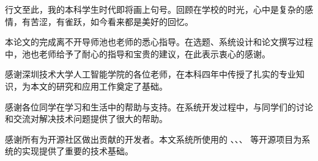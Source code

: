 
\begin{thankscontent}
    行文至此，我的本科学生时代即将画上句号。回顾在学校的时光，心中是复杂的感情，有苦涩，有雀跃，如今看来都是美好的回忆。

    本论文的完成离不开导师池也老师的悉心指导。在选题、系统设计和论文撰写过程中，池也老师给予了耐心的指导和宝贵的建议，在此表示衷心的感谢。

    感谢深圳技术大学人工智能学院的各位老师，在本科四年中传授了扎实的专业知识，为本文的研究和应用工作奠定了基础。

    感谢各位同学在学习和生活中的帮助与支持。在系统开发过程中，与同学们的讨论和交流对解决技术问题提供了很大的帮助。

    感谢所有为开源社区做出贡献的开发者。本文系统所使用的 、、、 等开源项目为系统的实现提供了重要的技术基础。

\end{thankscontent}
